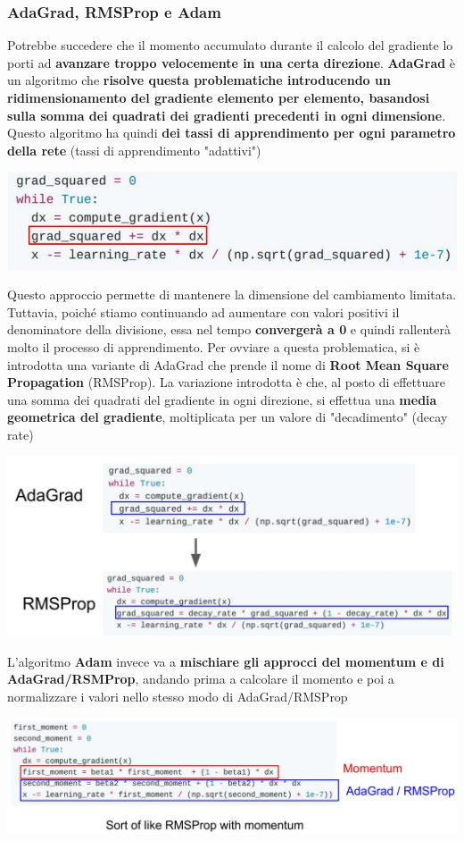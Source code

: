 \documentclass[12pt]{article}
\begin{document}
\subsubsection{AdaGrad, RMSProp e Adam}
Potrebbe succedere che il momento accumulato durante il calcolo del gradiente lo porti ad \textbf{avanzare troppo velocemente in una certa direzione}.
\textbf{AdaGrad} è un algoritmo che \textbf{risolve questa problematiche introducendo un ridimensionamento del gradiente elemento per elemento, basandosi sulla somma dei quadrati dei gradienti precedenti in ogni dimensione}.
Questo algoritmo ha quindi \textbf{dei tassi di apprendimento per ogni parametro della rete} (tassi di apprendimento "adattivi")
\begin{center}
    \includegraphics[width =0.80\linewidth]{Images/170.PNG}
\end{center}
Questo approccio permette di mantenere la dimensione del cambiamento limitata.
Tuttavia, poiché stiamo continuando ad aumentare con valori positivi il denominatore della divisione, essa nel tempo \textbf{convergerà a 0} e quindi rallenterà molto il processo di apprendimento.
Per ovviare a questa problematica, si è introdotta una variante di AdaGrad che prende il nome di \textbf{Root Mean Square Propagation} (RMSProp).
La variazione introdotta è che, al posto di effettuare una somma dei quadrati del gradiente in ogni direzione, si effettua una \textbf{media geometrica del gradiente}, moltiplicata per un valore di "decadimento" (decay rate)
\begin{center}
    \includegraphics[width =0.65\linewidth]{Images/171.PNG}
\end{center}
L'algoritmo \textbf{Adam} invece va a \textbf{mischiare gli approcci del momentum e di AdaGrad/RSMProp}, andando prima a calcolare il momento e poi a normalizzare i valori nello stesso modo di AdaGrad/RMSProp
\begin{center}
    \includegraphics[width =1\linewidth]{Images/172.PNG}
\end{center}
\end{document}
